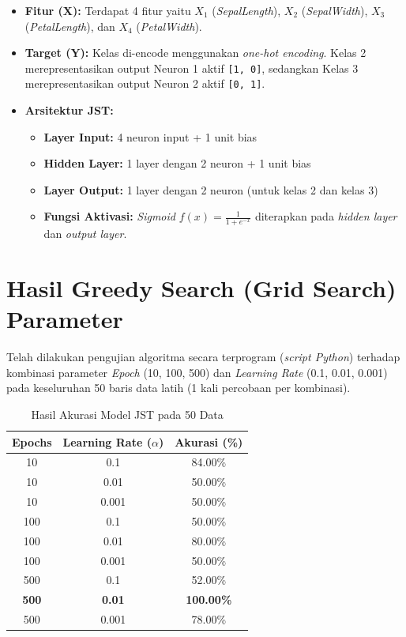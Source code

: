\documentclass[12pt,a4paper]{article}
\begin{document}
\begin{itemize}
    \item \textbf{Fitur (X):} Terdapat 4 fitur yaitu $X_1$ (\textit{SepalLength}), $X_2$ (\textit{SepalWidth}), $X_3$ (\textit{PetalLength}), dan $X_4$ (\textit{PetalWidth}).
    \item \textbf{Target (Y):} Kelas di-encode menggunakan \textit{one-hot encoding}. Kelas 2 merepresentasikan output Neuron 1 aktif \texttt{[1, 0]}, sedangkan Kelas 3 merepresentasikan output Neuron 2 aktif \texttt{[0, 1]}.
    \item \textbf{Arsitektur JST:}
    \begin{itemize}
        \item \textbf{Layer Input:} 4 neuron input + 1 unit bias
        \item \textbf{Hidden Layer:} 1 layer dengan 2 neuron + 1 unit bias
        \item \textbf{Layer Output:} 1 layer dengan 2 neuron (untuk kelas 2 dan kelas 3)
        \item \textbf{Fungsi Aktivasi:} \textit{Sigmoid} $f(x) = \frac{1}{1 + e^{-x}}$ diterapkan pada \textit{hidden layer} dan \textit{output layer}.
    \end{itemize}
\end{itemize}

\section{Hasil Greedy Search (Grid Search) Parameter}

Telah dilakukan pengujian algoritma secara terprogram (\textit{script Python}) terhadap kombinasi parameter \textit{Epoch} (10, 100, 500) dan \textit{Learning Rate} (0.1, 0.01, 0.001) pada keseluruhan 50 baris data latih (1 kali percobaan per kombinasi).

\begin{table}[H]
    \centering
    \caption{Hasil Akurasi Model JST pada 50 Data}
    \vspace{0.2cm}
    \begin{tabular}{c c c}
        \toprule
        \textbf{Epochs} & \textbf{Learning Rate} ($\alpha$) & \textbf{Akurasi (\%)} \\
        \midrule
        10 & 0.1 & 84.00\% \\
        10 & 0.01 & 50.00\% \\
        10 & 0.001 & 50.00\% \\
        100 & 0.1 & 50.00\% \\
        100 & 0.01 & 80.00\% \\
        100 & 0.001 & 50.00\% \\
        500 & 0.1 & 52.00\% \\
        \textbf{500} & \textbf{0.01} & \textbf{100.00\%} \\
        500 & 0.001 & 78.00\% \\
        \bottomrule
    \end{tabular}
\end{table}
\end{document}
